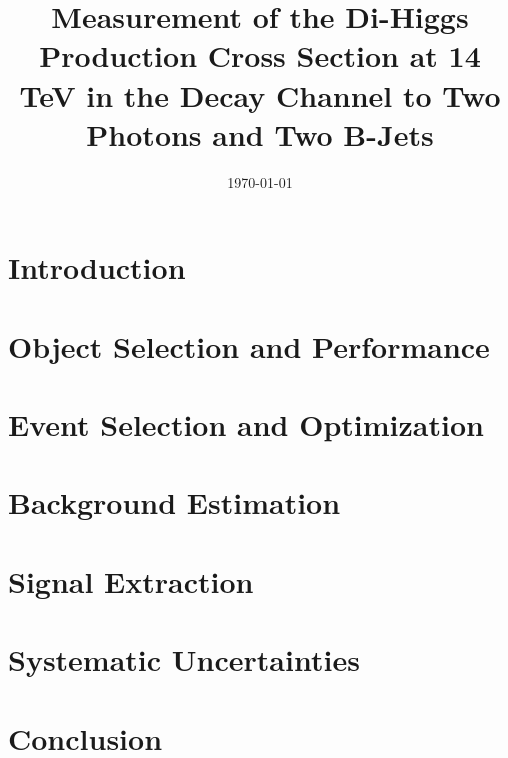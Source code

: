 \documentclass{cmspaper}
\begin{document}
\begin{titlepage}


  \date{\today}

  \title{Measurement of the Di-Higgs Production Cross Section at 14 TeV in the Decay Channel to Two Photons and Two B-Jets}

   

  \begin{abstract}

  \end{abstract} 

\end{titlepage}
\tableofcontents
\newpage 

\section{Introduction}
  \label{sec:intro}

\section{Object Selection and Performance}
\label{sec:objects}

\section{Event Selection and Optimization}
\label{sec:eventselection}

\section{Background Estimation}
\label{sec:bkgestimation}

\section{Signal Extraction}
\label{sec:signalextraction}

\section{Systematic Uncertainties}
\label{sec:systematics}

\section{Conclusion}
\label{sec:conclusion}





\appendix
\appendixpage
\end{document}
